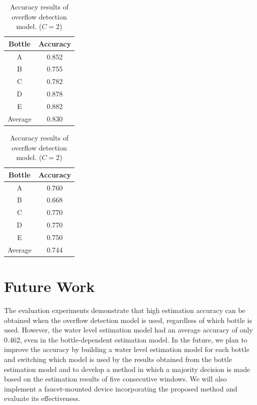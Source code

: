 \documentclass[sigconf]{acmart}
\begin{document}
\begin{table}[!t]
  \centering
  \caption{Accuracy results of overflow detection model. ($C=2$)}
  \begin{minipage}[t]{0.45\linewidth}
    \centering
    \begin{tabular}{c|c} \hline\hline
    Bottle & Accuracy \\ \hline
    A & 0.852 \\
    B & 0.755 \\
    C & 0.782 \\
    D & 0.878 \\
    E & 0.882 \\ \hline
    Average & 0.830 \\ \hline
    \end{tabular}
    \label{tab:result_2_dependent}
  \end{minipage}
  \begin{minipage}[t]{0.45\linewidth}
    \centering
    \begin{tabular}{c|c} \hline\hline
    Bottle & Accuracy \\ \hline
    A & 0.760 \\
    B & 0.668 \\
    C & 0.770 \\
    D & 0.770 \\
    E & 0.750 \\ \hline
    Average & 0.744 \\ \hline
    \end{tabular}
    \label{tab:result_2_independent}
  \end{minipage}
  \label{tab:result_2}
\end{table}



\section{Future Work}
\label{sec:future_work}
The evaluation experiments demonstrate that high estimation accuracy can be obtained when the overflow detection model is used, regardless of which bottle is used. However, the water level estimation model had an average accuracy of only 0.462, even in the bottle-dependent estimation model. In the future, we plan to improve the accuracy by building a water level estimation model for each bottle and switching which model is used by the results obtained from the bottle estimation model and to develop a method in which a majority decision is made based on the estimation results of five consecutive windows. We will also implement a faucet-mounted device incorporating the proposed method and evaluate its effectiveness.
\end{document}
